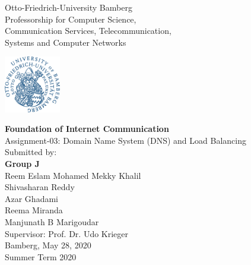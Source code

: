
\thispagestyle{empty}
\begin{center}
\begin{minipage}{0.7\textwidth}
\centering
\footnotesize{Otto-Friedrich-University Bamberg}\\
	\vspace{0.3cm}
\normalsize{Professorship for Computer Science,
	\\Communication Services, Telecommunication,
 	\\Systems and Computer Networks}
\end{minipage}
\begin{minipage}{0.1\textwidth}\raggedleft
\includegraphics[width=70pt]{Images/UMI-LOGO.png}
\end{minipage}




	


	\vspace{1cm}
	\doublespacing
	{\textbf{Foundation of Internet Communication}}\\
	\singlespacing
	{\normalsize{Assignment-03: Domain Name System (DNS) and Load}
	 Balancing}\\
    \vfill
    \footnotesize{Submitted by:}\\
    \textbf{Group J}\\
    \vspace{0.5cm}
     \normalsize{Reem Eslam Mohamed Mekky Khalil}\\
      \normalsize{Shivasharan Reddy}\\
     \normalsize{Azar Ghadami}\\
     \normalsize{Reema Miranda}\\
     \normalsize{Manjunath B Marigoudar}\\

     \vspace{0.5cm}
     \small{Supervisor: Prof. Dr. Udo Krieger}\\
     \vspace{0.5cm}
     \footnotesize{Bamberg, May 28, 2020}\\
    \footnotesize{Summer Term 2020}
 

 
\end{center}
\clearpage

\clearpage
